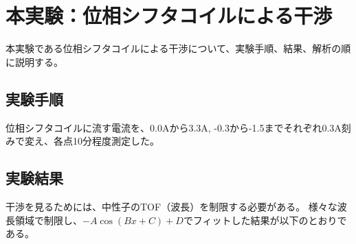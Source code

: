 \begingroup
\def\imgwidth{5.5cm}

\section{本実験：位相シフタコイルによる干渉}\label{phase_shifter_sec}
本実験である位相シフタコイルによる干渉について、実験手順、結果、解析の順に説明する。

\subsection{実験手順}
位相シフタコイルに流す電流を、0.0Aから3.3A, -0.3から-1.5までそれぞれ0.3A刻みで変え、各点10分程度測定した。

\subsection{実験結果}
干渉を見るためには、中性子のTOF（波長）を制限する必要がある。
様々な波長領域で制限し、$-A\cos(Bx+C)+D$でフィットした結果が以下のとおりである。
